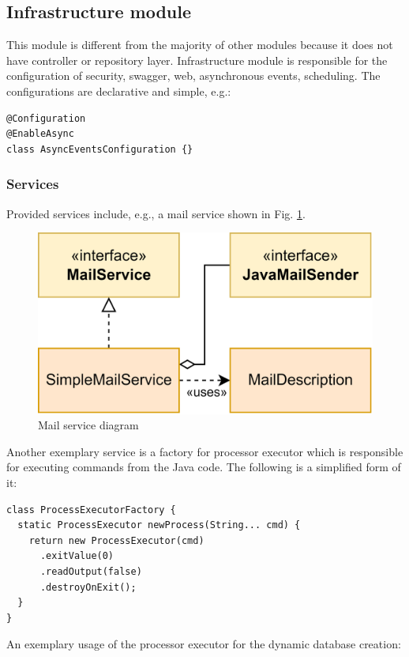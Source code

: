 \documentclass[a4paper,twoside,12pt]{book}
\begin{document}
\subsection{Infrastructure module}

This module is different from the majority of other modules because it does not have controller or repository layer.
%
Infrastructure module is responsible for the configuration of security, swagger, web, asynchronous events, scheduling.
%
The configurations are declarative and simple, e.g.:
\begin{verbatim}
@Configuration
@EnableAsync
class AsyncEventsConfiguration {}
\end{verbatim}

\subsubsection{Services}

Provided services include, e.g., a mail service shown in Fig. \ref{fig:mail_service}.
%
\begin{figure}
  \centering
  \includegraphics[width=0.6 \linewidth]{img/mail_service.png}
  \caption{Mail service diagram}
  \label{fig:mail_service}
\end{figure}
%
Another exemplary service is a factory for processor executor which is responsible for executing commands from the Java code. The following is a simplified form of it:

\begin{verbatim}
class ProcessExecutorFactory {
  static ProcessExecutor newProcess(String... cmd) {
    return new ProcessExecutor(cmd)
      .exitValue(0)
      .readOutput(false)
      .destroyOnExit();
  }
}
\end{verbatim}

An exemplary usage of the processor executor for the dynamic database creation:
\end{document}
